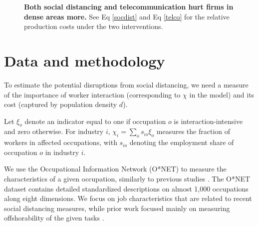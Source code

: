 \begin{figure}[!h]
\plos{\centering}

\caption{{\bf Both social distancing and telecommunication hurt firms in dense areas more.}
See Eq \eqref{socdist} and Eq \eqref{telco} for the relative production costs under the two interventions.}
\label{fig2}
\end{figure}

\section*{Data and methodology}
To estimate the potential disruptions from social distancing, we need a measure of the importance of worker interaction (corresponding to $\chi$ in the model) and its cost (captured by population density $d$). 

Let $\xi_o$ denote an indicator equal to one if occupation $o$ is interaction-intensive and zero otherwise. For industry $i$, $\chi_i = \sum_o s_{io}\xi_o$ measures the fraction of workers in affected occupations, with $s_{io}$ denoting the employment share of occupation $o$ in industry $i$.

We use the Occupational Information Network (O*NET) \cite{National_Center_for_ONET_Development2020-wj} to measure the characteristics of a given occupation, similarly to previous studies \cite{Firpo2011-hp,Autor2013-sh,Jin2020-tq,Dingel2020-lh,Leibovici2020-qr,Mongey2020-qc}. The O*NET dataset contains detailed standardized descriptions on almost 1,000 occupations along eight dimensions. We focus on job characteristics that are related to recent social distancing measures, while prior work focused mainly on measuring offshorability of the given tasks \cite{Firpo2011-hp,Autor2013-sh}.

